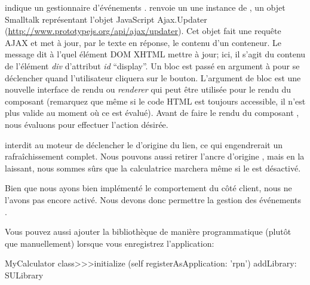\documentclass[a4paper,10pt,twoside]{book}
\begin{document}
 indique un gestionnaire d'événements
\ind{\jscript}.
 renvoie un \updater \ie une instance de
, un objet Smalltalk représentant l'objet JavaScript
Ajax.Updater (\url{http://www.prototypejs.org/api/ajax/updater}).
Cet objet fait une requête AJAX et met à jour, par le texte en
réponse, le contenu d'un conteneur.
Le message  dit à l'\updater quel élément DOM XHTML mettre à jour; ici,
il s'agit du contenu de l'élément \emph{div} d'attribut \emph{id}
``display''.
Un bloc est passé en argument à  pour se déclencher
quand l'utilisateur cliquera sur le bouton.
L'argument de bloc  est une nouvelle interface de rendu ou
  \emph{renderer} qui peut être utilisée pour le rendu du composant
(remarquez que même si le code HTML est toujours accessible,
  il n'est plus valide au moment où ce \callback est évalué).
Avant de faire le rendu du composant , nous évaluons
 pour effectuer l'action désirée.

 interdit au moteur \jscript de déclencher le
\callback d'origine du lien, ce qui engendrerait un rafraîchissement
complet. %
Nous pouvons aussi retirer l'ancre d'origine , mais en
la laissant, nous sommes sûrs que la calculatrice marchera même si le
\jscript est désactivé.


Bien que nous ayons bien implémenté le comportement du côté client,
nous ne l'avons pas encore activé.
Nous devons donc permettre la gestion des événements \jscript.


Vous pouvez aussi ajouter la bibliothèque de manière programmatique
(plutôt que manuellement) lorsque vous enregistrez l'application:
\begin{code}{}
MyCalculator class>>>initialize
	(self registerAsApplication: 'rpn')
		addLibrary: SULibrary
\end{code}
\end{document}
